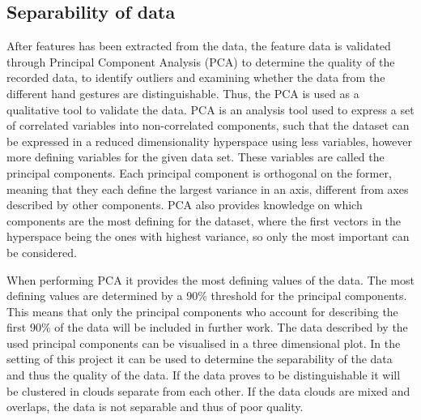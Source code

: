 \subsection{Separability of data} \label{sec:dataValidation}


After features has been extracted from the data, the feature data is validated through Principal Component Analysis (PCA) to determine the quality of the recorded data, to identify outliers and examining whether the data from the different hand gestures are distinguishable. Thus, the PCA is used as a qualitative tool to validate the data. %
PCA is an analysis tool used to express a set of correlated variables into non-correlated components, such that the dataset can be expressed in a reduced dimensionality hyperspace using less variables, however more defining variables for the given data set. These variables are called the principal components. Each principal component is orthogonal on the former, meaning that they each define the largest variance in an axis, different from axes described by other components. PCA also provides knowledge on which components are the most defining for the dataset, where the first vectors in the hyperspace being the ones with highest variance, so only the most important can be considered. 

When performing PCA it provides the most defining values of the data. The most defining values are determined by a 90\% threshold for the principal components. This means that only the principal components who account for describing the first 90\% of the data will be included in further work. The data described by the used principal components can be visualised in a three dimensional plot. In the setting of this project it can be used to determine the separability of the data and thus the quality of the data. If the data proves to be distinguishable it will be clustered in clouds separate from each other. If the data clouds are mixed and overlaps, the data is not separable and thus of poor quality. 

